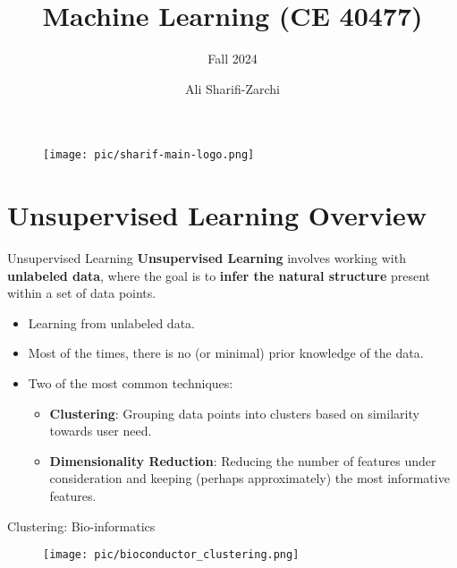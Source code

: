 \documentclass[serif, aspectratio=169]{beamer}
\author{Ali Sharifi-Zarchi}
\title{Machine Learning (CE 40477)}
\subtitle{Fall 2024}
\institute{
    CE Department \\
    Sharif University of Technology
}
\begin{document}
\begin{frame}
    \titlepage
    \vspace*{-0.6cm}
    \begin{figure}[htpb]
        \begin{center}
            \texttt{[image: pic/sharif-main-logo.png]}
        \end{center}
    \end{figure}
\end{frame}

\begin{frame}    
\tableofcontents[sectionstyle=show,
subsectionstyle=show/shaded/hide,
subsubsectionstyle=show/shaded/hide]
\end{frame}

\section{Unsupervised Learning Overview}
\begin{frame}{Unsupervised Learning}
    \textbf{Unsupervised Learning} involves working with \textbf{unlabeled data}, where the goal is to \textbf{infer the natural structure} present within a set of data points.
    \begin{itemize}
        \item Learning from unlabeled data.
        \item Most of the times, there is no (or minimal) prior knowledge of the data.
        \item Two of the most common techniques:
        \begin{itemize}
            \item \textbf{Clustering}: Grouping data points into clusters based on similarity towards user need.
            \item \textbf{Dimensionality Reduction}: Reducing the number of features under consideration and keeping (perhaps approximately) the most informative features.
        \end{itemize}
    \end{itemize}
\end{frame}

\begin{frame}{Clustering: Bio-informatics}
    \begin{figure}
        \centering
        \texttt{[image: pic/bioconductor\_clustering.png]}
    \end{figure}
\end{frame}
\end{document}
